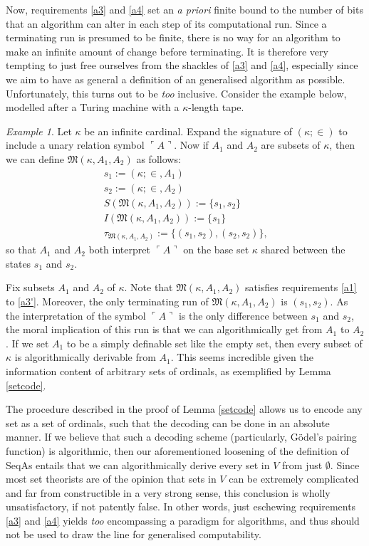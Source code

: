 \documentclass[12pt, twoside]{memoir}
\numberwithin{equation}{section}
\theoremstyle{definition}
\theoremstyle{remark}
\newtheorem{ex}[thm]{Example}
\theoremstyle{definition}
\theoremstyle{definition}
\theoremstyle{definition}
\theoremstyle{remark}
\begin{document}
Now, requirements \ref{a3} and \ref{a4} set an \textit{a priori} finite bound to the number of bits that an algorithm can alter in each step of its computational run. Since a terminating run is presumed to be finite, there is no way for an algorithm to make an infinite amount of change before terminating. It is therefore very tempting to just free ourselves from the shackles of \ref{a3} and \ref{a4}, especially since we aim to have as general a definition of an generalised algorithm as possible. Unfortunately, this turns out to be \textit{too} inclusive. Consider the example below, modelled after a Turing machine with a $\kappa$-length tape.

\begin{ex}\label{ex21}
Let $\kappa$ be an infinite cardinal. Expand the signature of $(\kappa; \in)$ to include a unary relation symbol $\ulcorner A \urcorner$. Now if $A_1$ and $A_2$ are subsets of $\kappa$, then we can define $\mathfrak{M}(\kappa, A_1, A_2)$ as follows:
\begin{gather*}
    s_1 := (\kappa; \in, A_1) \\
    s_2 := (\kappa; \in, A_2) \\
    S(\mathfrak{M}(\kappa, A_1, A_2)) := \{s_1, s_2\} \\
    I(\mathfrak{M}(\kappa, A_1, A_2)) := \{s_1\} \\
    \tau_{\mathfrak{M}(\kappa, A_1, A_2)} := \{(s_1, s_2), (s_2, s_2)\} \text{,}
\end{gather*}
so that $A_1$ and $A_2$ both interpret $\ulcorner A \urcorner$ on the base set $\kappa$ shared between the states $s_1$ and $s_2$. 
\end{ex}

Fix subsets $A_1$ and $A_2$ of $\kappa$. Note that $\mathfrak{M}(\kappa, A_1, A_2)$ satisfies requirements \ref{a1} to \ref{a3'}. Moreover, the only terminating run of $\mathfrak{M}(\kappa, A_1, A_2)$ is $(s_1, s_2)$. As the interpretation of the symbol $\ulcorner A \urcorner$ is the only difference between $s_1$ and $s_2$, the moral implication of this run is that we can algorithmically get from $A_1$ to $A_2$. If we set $A_1$ to be a simply definable set like the empty set, then every subset of $\kappa$ is algorithmically derivable from $A_1$. This seems incredible given the information content of arbitrary sets of ordinals, as exemplified by Lemma \ref{setcode}.

The procedure described in the proof of Lemma \ref{setcode} allows us to encode any set as a set of ordinals, such that the decoding can be done in an absolute manner. If we believe that such a decoding scheme (particularly, G\"{o}del's pairing function) is algorithmic, then our aforementioned loosening of the definition of SeqAs entails that we can algorithmically derive every set in $V$ from just $\emptyset$. Since most set theorists are of the opinion that sets in $V$ can be extremely complicated and far from constructible in a very strong sense, this conclusion is wholly unsatisfactory, if not patently false. In other words, just eschewing requirements \ref{a3} and \ref{a4} yields \emph{too} encompassing a paradigm for algorithms, and thus should not be used to draw the line for generalised computability.
\end{document}
